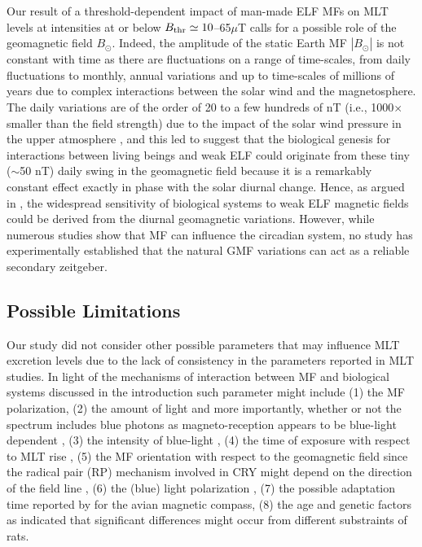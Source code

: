 \documentclass[a4]{article}
\begin{document}
Our result of a threshold-dependent impact of man-made ELF MFs on MLT levels at intensities at or below $B_{\rm thr}\simeq10$--65$\mu$T  calls for a possible  role of the geomagnetic field $B_{\odot}$.  Indeed, the amplitude of the static Earth MF $|B_{\odot}|$ is not constant with time as there are fluctuations on a range of time-scales, from daily fluctuations
to monthly, annual variations and up to  time-scales of millions of years \citep[see e.g.][]{CourtillotV_1988} due to complex interactions between the solar wind and the magnetosphere.  The daily variations are of the order of 20 to a few hundreds of  nT (i.e., 1000$\times$ smaller than the field strength)
 due to the impact of the solar wind pressure in the upper atmosphere \citep[e.g.][]{Hitchman1998},   
and this led \citet{Liboff2013}  to suggest that the
biological genesis for interactions between living beings and weak ELF could originate from these tiny ($\sim$50 nT) daily swing in the geomagnetic field    because it is a remarkably constant effect exactly in phase with the solar diurnal change.  Hence, as argued in  \citet{Liboff2013},  the widespread sensitivity of biological systems to weak ELF magnetic fields could be  derived from the diurnal geomagnetic variations.
However, while numerous studies show that MF
can influence the circadian system, no study has experimentally established that the natural GMF variations can act as a reliable secondary zeitgeber.
 


\subsection*{Possible Limitations}
\label{section:limitations}

Our study did not consider other possible parameters that may influence MLT excretion levels due to the lack of consistency in the parameters reported in MLT studies.
In light of the mechanisms of interaction between MF and biological systems discussed in the introduction %
such parameter might include
 (1) the MF polarization, 
 (2) the amount of light and more importantly, whether or not the spectrum includes blue photons  as magneto-reception appears to be blue-light dependent \citep[e.g.][]{Chasmore1999,Chaves2011,Gegear2008,Michael2017,Ritz2000,Vanderstraeten2018}, 
 (3) the intensity of blue-light \citep[as magneto-reception might be inversely proportional to the photon flux, e.g.][]{Vanderstraeten2018},
 (4) the  time of exposure with respect to MLT rise \citep[as suggested by][]{Wood1998,Vanderstraeten2012},
  (5) the  MF orientation with respect to the geomagnetic field since the radical pair (RP) mechanism involved in CRY
might depend on the direction of the field line \citep{Wiltschko2014,Zhang2015},
 (6)  the (blue) light polarization \citep[as discussed in][]{Stoneham2012,Hore2016},
 (7) the possible adaptation time reported by \citet{Wiltschko2014} for the avian magnetic compass,
 (8) the age \citep{Vanderstraeten2012} and genetic factors as \citet{Fedrowitz2004} indicated that significant differences might occur from different substraints of rats.
 
\end{document}
